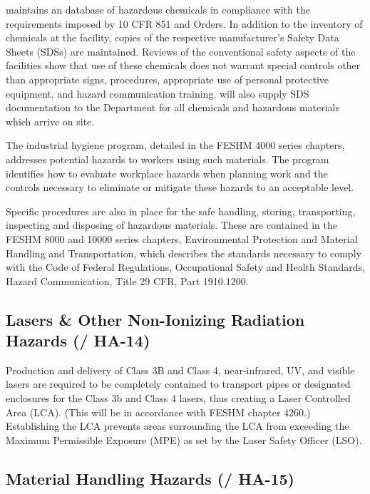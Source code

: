 \fnal maintains an database of hazardous chemicals in compliance
with the requirements imposed by 10 CFR 851 and  Orders. In
addition to the inventory of chemicals at the facility, copies of the
respective manufacturer's Safety Data Sheets (SDSs) are
maintained. Reviews of the conventional safety aspects of the
facilities show that use of these chemicals does not warrant special
controls other than appropriate signs, procedures, appropriate use of
personal protective equipment, and hazard communication training. 
will also supply SDS documentation to the \surf {} Department for all
chemicals and hazardous materials which arrive on site.

The industrial hygiene program, detailed in the FESHM 4000 series
chapters, addresses potential hazards to workers using such
materials. The program identifies how to evaluate workplace hazards
when planning work and the controls necessary to eliminate or mitigate
these hazards to an acceptable level.

Specific procedures are also in place for the safe handling, storing,
transporting, inspecting and disposing of hazardous materials. These
are contained in the FESHM 8000 and 10000 series chapters,
Environmental Protection and Material Handling and Transportation,
which describes the standards necessary to comply with the Code of
Federal Regulations, Occupational Safety and Health Standards, Hazard
Communication, Title 29 CFR, Part 1910.1200.


\subsection{Lasers \& Other Non-Ionizing Radiation Hazards (/ HA-14)}

Production and delivery of Class 3B and Class 4, near-infrared, UV,
and visible lasers are required to be completely contained to
transport pipes or designated enclosures for the Class 3b and Class 4
lasers, thus creating a Laser Controlled Area (LCA). (This will be in
accordance with \fnal FESHM chapter 4260.)  Establishing the LCA
prevents areas surrounding the LCA from exceeding the Maximum
Permissible Exposure (MPE) as set by the \fnal Laser Safety Officer
(LSO).

\subsection{Material Handling Hazards (/ HA-15)}

